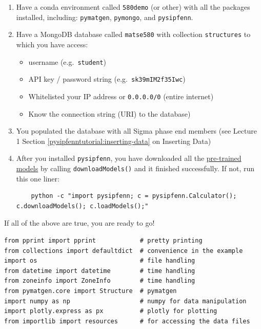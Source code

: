 \begin{enumerate}
    \item Have a conda environment called \texttt{580demo} (or other) with all the packages installed, including: \texttt{pymatgen}, \texttt{pymongo}, and \texttt{pysipfenn}.

    \item Have a MongoDB database called \texttt{matse580} with collection \texttt{structures} to which you have access:
    \begin{itemize}
      \item username (e.g.~\texttt{student})
      \item API key / password string
        (e.g.~\texttt{sk39mIM2f35Iwc})
      \item Whitelisted your IP address or \texttt{0.0.0.0/0}
        (entire internet)
      \item Know the connection string (URI) to the database)
    \end{itemize}

    \item You populated the database with all Sigma phase end members (see Lecture 1 Section \ref{pysipfenntutorial:inserting-data} on Inserting Data)

    \item After you installed \texttt{pysipfenn}, you have downloaded all the \href{https://zenodo.org/records/7373089}{pre-trained models} by calling \texttt{downloadModels()} and it finished successfully. If not, run this one liner:
    \begin{verbatim}
    python -c "import pysipfenn; c = pysipfenn.Calculator(); c.downloadModels(); c.loadModels();"
    \end{verbatim}
\end{enumerate}


If all of the above are true, you are ready to go!

\begin{verbatim}
from pprint import pprint            # pretty printing
from collections import defaultdict  # convenience in the example
import os                            # file handling
from datetime import datetime        # time handling
from zoneinfo import ZoneInfo        # time handling
from pymatgen.core import Structure  # pymatgen
import numpy as np                   # numpy for data manipulation
import plotly.express as px          # plotly for plotting
from importlib import resources      # for accessing the data files
\end{verbatim}

